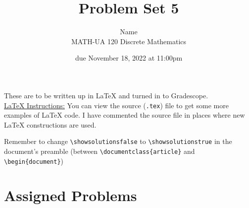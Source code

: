 \documentclass{article}
\title{Problem Set 5}
\author{%
    Name
\\  MATH-UA 120 Discrete Mathematics
}
\date{due November 18, 2022 at 11:00pm}
\newif\ifshowsolutions
\newcommand{\danger}{\marginpar[\hfill\dbend]{\dbend\hfill}}
\theoremstyle{definition}
\begin{document}
\maketitle



These are to be written up in \LaTeX{} and turned in to Gradescope.\\



\ifshowsolutions
    \SetupExSheets{solution/print=true}
\else
    \danger
 \underline{ \LaTeX{}  Instructions:}  You can view the source (\texttt{.tex}) file to get some more examples of \LaTeX{} code.  I have commented the source file in places where new \LaTeX{} constructions are used.
  
  Remember to change \verb|\showsolutionsfalse| to \verb|\showsolutionstrue|
    in the document's preamble 
    (between \verb|\documentclass{article}| and \verb|\begin{document}|)
\fi

\section*{Assigned Problems}
\end{document}
